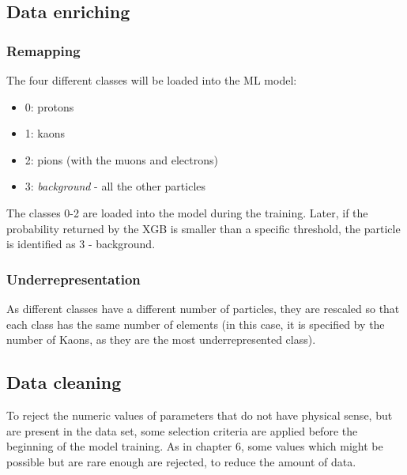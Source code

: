 \subsection{Data enriching}
\subsubsection{Remapping}
The four different classes will be loaded into the ML model:
\begin{itemize}
    \item 0: protons
    \item 1: kaons
    \item 2: pions (with the muons and electrons)
    \item 3: \emph{background} - all the other particles
\end{itemize}
The classes 0-2 are loaded into the model during the training. Later, if the probability returned by the XGB is smaller than a specific threshold, the particle is identified as 3 - background.
\subsubsection{Underrepresentation}
As different classes have a different number of particles, they are rescaled so that each class has the same number of elements (in this case, it is specified by the number of Kaons, as they are the most underrepresented class).
\subsection{Data cleaning}
To reject the numeric values of parameters that do not have physical sense, but are present in the data set, some selection criteria are applied before the beginning of the model training. As in chapter 6, some values which might be possible but are rare enough are rejected, to reduce the amount of data.

